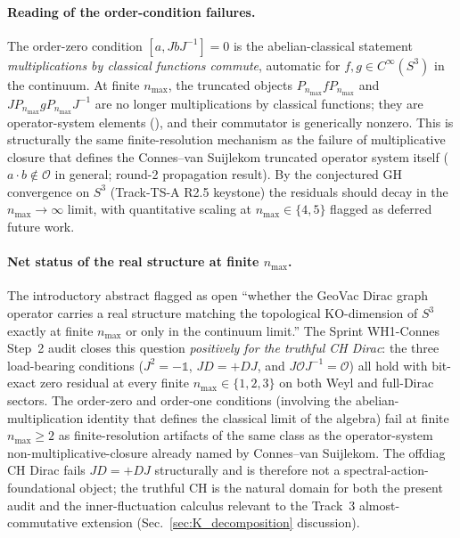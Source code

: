 \documentclass[11pt]{article}
\begin{document}
\paragraph{Reading of the order-condition failures.}  The
order-zero condition $[a, J b J^{-1}] = 0$ is the
abelian-classical statement \emph{multiplications by classical
functions commute}, automatic for $f, g \in C^\infty(S^3)$ in the
continuum.  At finite $n_{\max}$, the truncated objects
$P_{n_{\max}} f P_{n_{\max}}$ and
$J P_{n_{\max}} g P_{n_{\max}} J^{-1}$ are no longer multiplications
by classical functions; they are operator-system elements
(\cite[Sec.~2]{connes_vs2021}), and their commutator is
generically nonzero.  This is structurally the same finite-resolution
mechanism as the failure of multiplicative closure that defines the
Connes--van Suijlekom truncated operator system itself
($a \cdot b \notin \mathcal{O}$ in general; round-2 propagation
result).  By the conjectured GH convergence on $S^3$
(Track-TS-A R2.5 keystone) the residuals should decay in the
$n_{\max} \to \infty$ limit, with quantitative scaling at $n_{\max}
\in \{4, 5\}$ flagged as deferred future work.

\paragraph{Net status of the real structure at finite
$n_{\max}$.}  The introductory abstract flagged as open
``whether the GeoVac Dirac graph operator carries a real structure
matching the topological $\mathrm{KO}$-dimension of $S^3$ exactly
at finite $n_{\max}$ or only in the continuum limit.''
The Sprint WH1-Connes Step~2 audit closes this question
\emph{positively for the truthful CH Dirac}: the three load-bearing
conditions ($J^2 = -\mathbb{1}$, $JD = +DJ$, and
$J \mathcal{O} J^{-1} = \mathcal{O}$) all hold with bit-exact zero
residual at every finite $n_{\max} \in \{1, 2, 3\}$ on both Weyl and
full-Dirac sectors.  The order-zero and order-one conditions
(involving the abelian-multiplication identity that defines the
classical limit of the algebra) fail at finite $n_{\max} \ge 2$ as
finite-resolution artifacts of the same class as the operator-system
non-multiplicative-closure already named by Connes--van Suijlekom.
The offdiag CH Dirac fails $JD = +DJ$ structurally and is therefore
not a spectral-action-foundational object; the truthful CH is the
natural domain for both the present audit and the inner-fluctuation
calculus relevant to the Track~3 almost-commutative extension
(Sec.~\ref{sec:K_decomposition} discussion).
\end{document}
